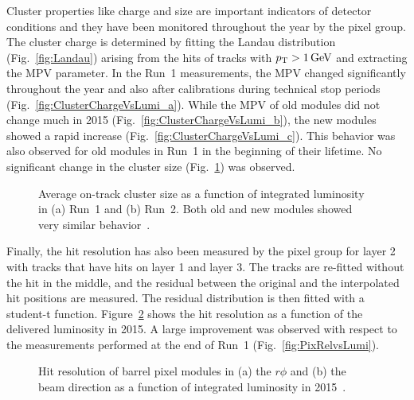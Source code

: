 Cluster properties like charge and size are important indicators of detector conditions and they have been monitored throughout the year by the pixel group.
The cluster charge is determined by fitting the Landau distribution (Fig.~\ref{fig:Landau}) arising from the hits of tracks with $p_{\mathrm{T}} > 1\,\text{Ge\hspace{-.08em}V}$ and extracting the MPV parameter.
In the Run~1 measurements, the MPV changed significantly throughout the year and also after calibrations during technical stop periods (Fig.~\ref{fig:ClusterChargeVsLumi_a}).
While the MPV of old modules did not change much in 2015 (Fig.~\ref{fig:ClusterChargeVsLumi_b}), the new modules showed a rapid increase (Fig.~\ref{fig:ClusterChargeVsLumi_c}).
This behavior was also observed for old modules in Run~1 in the beginning of their lifetime. No significant change in the cluster size (Fig.~\ref{fig:ClusterSizeVsLumi}) was observed.

\begin{figure}[!htb]
 \begin{center}
 \end{center}
 \caption{Average on-track cluster size as a function of integrated luminosity in (a) Run~1 and (b) Run~2. Both old and new modules showed very similar behavior~\cite{PixelOffline}.}
 \label{fig:ClusterSizeVsLumi}
\end{figure}

Finally, the hit resolution has also been measured by the pixel group for layer 2 with tracks that have hits on layer 1 and layer 3.
The tracks are re-fitted without the hit in the middle, and the residual between the original and the interpolated hit positions are measured.
The residual distribution is then fitted with a student-t function. Figure~\ref{fig:RelVsLumi2015} shows the hit resolution as a function of the delivered luminosity in 2015.
A large improvement was observed with respect to the measurements performed at the end of Run~1 (Fig.~\ref{fig:PixRelvsLumi}).

\begin{figure}[!htb]
 \begin{center}
 \end{center}
 \caption{Hit resolution of barrel pixel modules in (a) the $r\phi$ and (b) the beam direction as a function of integrated luminosity in 2015~\cite{PixelOffline}.}
 \label{fig:RelVsLumi2015}
\end{figure}
